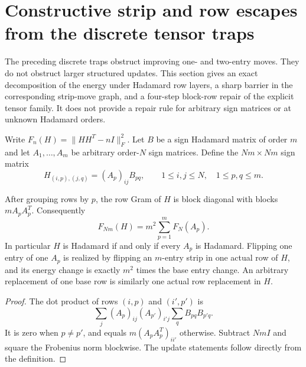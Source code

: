 \section{Constructive strip and row escapes from the discrete tensor traps}
\label{sec:exchanges-layer-escape}
The preceding discrete traps obstruct improving one- and two-entry moves.
They do not obstruct larger structured updates. This section gives an
exact decomposition of the energy under Hadamard row layers, a sharp
barrier in the corresponding strip-move graph, and a four-step block-row
repair of the explicit tensor family. It does not provide a repair rule
for arbitrary sign matrices or at unknown Hadamard orders.

Write $F_n(H)=\|HH^T-nI\|_F^2$. Let $B$ be a sign Hadamard matrix of
order $m$ and let $A_1,\ldots,A_m$ be arbitrary order-$N$ sign matrices.
Define the $Nm\times Nm$ sign matrix
\[
 H_{(i,p),(j,q)}=(A_p)_{ij}B_{pq},\qquad
 1\le i,j\le N,\quad1\le p,q\le m.
\]
\begin{theorem}
\label{thm:exchanges-layer-energy}
After grouping rows by $p$, the row Gram of $H$ is block diagonal with
blocks $mA_pA_p^T$. Consequently
\[
 F_{Nm}(H)=m^2\sum_{p=1}^m F_N(A_p).
\]
In particular $H$ is Hadamard if and only if every $A_p$ is Hadamard.
Flipping one entry of one $A_p$ is realized by flipping an $m$-entry
strip in one actual row of $H$, and its energy change is exactly
$m^2$ times the base entry change. An arbitrary replacement of one base
row is similarly one actual row replacement in $H$.
\end{theorem}
\begin{proof}
The dot product of rows $(i,p)$ and $(i',p')$ is
\[
 \sum_j(A_p)_{ij}(A_{p'})_{i'j}\sum_qB_{pq}B_{p'q}.
\]
It is zero when $p\ne p'$, and equals $m(A_pA_p^T)_{ii'}$ otherwise.
Subtract $NmI$ and square the Frobenius norm blockwise.
The update statements follow directly from the definition.
\end{proof}

